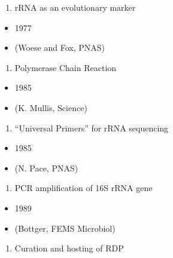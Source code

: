 \documentclass[
]{book}
\providecommand{\tightlist}{%
  \setlength{\itemsep}{0pt}\setlength{\parskip}{0pt}}
\begin{document}
\begin{enumerate}
\def\labelenumi{\arabic{enumi}.}
\tightlist
\item
  rRNA as an evolutionary marker
\end{enumerate}

\begin{itemize}
\tightlist
\item
  1977
\item
  (Woese and Fox, PNAS)
\end{itemize}

\begin{enumerate}
\def\labelenumi{\arabic{enumi}.}
\setcounter{enumi}{1}
\tightlist
\item
  Polymerase Chain Reaction
\end{enumerate}

\begin{itemize}
\tightlist
\item
  1985
\item
  (K. Mullis, Science)
\end{itemize}

\begin{enumerate}
\def\labelenumi{\arabic{enumi}.}
\setcounter{enumi}{2}
\tightlist
\item
  ``Universal Primers'' for rRNA sequencing
\end{enumerate}

\begin{itemize}
\tightlist
\item
  1985
\item
  (N. Pace, PNAS)
\end{itemize}

\begin{enumerate}
\def\labelenumi{\arabic{enumi}.}
\setcounter{enumi}{3}
\tightlist
\item
  PCR amplification of 16S rRNA gene
\end{enumerate}

\begin{itemize}
\tightlist
\item
  1989
\item
  (Bottger, FEMS Microbiol)
\end{itemize}

\begin{enumerate}
\def\labelenumi{\arabic{enumi}.}
\setcounter{enumi}{4}
\tightlist
\item
  Curation and hosting of RDP
\end{enumerate}
\end{document}
